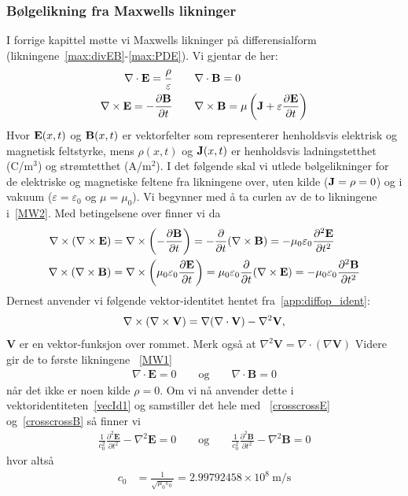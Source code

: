 \subsubsection{Bølgelikning fra Maxwells likninger}
I forrige kapittel møtte vi Maxwells likninger på differensialform (likningene~\eqref{max:divEB}-\eqref{max:PDE}). Vi gjentar de her: 
\begin{align}
\nabla \cdot \mathbf{E} = \frac{\rho}{\varepsilon}  &\qquad \nabla \cdot \mathbf{B} = 0 \label{MW1}\\
\nabla \times \mathbf{E} = -\frac{\partial \mathbf{B}}{\partial t} & \qquad \nabla \times \mathbf{B} = \mu \left( \mathbf{J} + \varepsilon \frac{\partial \mathbf{E}}{\partial t} \right)\label{MW2}
\end{align}
Hvor \( \mathbf{E}(x, t) \) og \( \mathbf{B}(x, t) \) er vektorfelter som representerer henholdsvis elektrisk og magnetisk feltstyrke, mens \( \rho(x, t) \) og \( \mathbf{J}(x, t) \) er henholdsvis ladningstetthet (C/m$^3$) og strømtetthet (A/m$^2$). 
I det følgende skal vi utlede bølgelikninger for de elektriske og magnetiske feltene fra likningene over, uten kilde ($\mathbf{J}=\rho=0$) og i vakuum ($\varepsilon=\varepsilon_0$ og $\mu=\mu_0$). Vi begynner med å ta curlen av de to likningene i~\eqref{MW2}. Med betingelsene over finner vi da 
\begin{align}
\label{crosscrossE}
\nabla \times (\nabla \times \mathbf{E}) 
&= \nabla \times \left( -\frac{\partial \mathbf{B}}{\partial t} \right) 
= -\frac{\partial}{\partial t} (\nabla \times \mathbf{B}) 
= -\mu_0 \varepsilon_0 \frac{\partial^2 \mathbf{E}}{\partial t^2} \\
\label{crosscrossB}\nabla \times (\nabla \times \mathbf{B}) 
&= \nabla \times \left( \mu_0 \varepsilon_0 \frac{\partial \mathbf{E}}{\partial t} \right) 
= \mu_0 \varepsilon_0 \frac{\partial}{\partial t} (\nabla \times \mathbf{E}) 
= -\mu_0 \varepsilon_0 \frac{\partial^2 \mathbf{B}}{\partial t^2}
\end{align}
Dernest anvender vi følgende vektor-identitet hentet fra~\ref{app:diffop_ident}:
\begin{align}
\label{vecId1}
\nabla \times (\nabla \times \mathbf{V}) = \nabla (\nabla \cdot \mathbf{V}) - \nabla^2 \mathbf{V},
\end{align}
$\mathbf{V}$ er en vektor-funksjon over rommet. Merk også at 
$\nabla^2 \mathbf{V} = \nabla \cdot (\nabla \mathbf{V})$
Videre gir de to første likningene ~\eqref{MW1}
\begin{align}
\nabla \cdot \mathbf{E} = 0\quad\quad\textrm{og}\quad\quad
\nabla \cdot \mathbf{B} = 0
\end{align}
når det ikke er noen kilde $\rho=0$.
Om vi nå anvender dette i vektoridentiteten~\eqref{vecId1} og samstiller det hele med ~\eqref{crosscrossE} og~\eqref{crosscrossB} så finner vi
\begin{align*}
\frac{1}{c_0^2} \frac{\partial^2 \mathbf{E}}{\partial t^2} - \nabla^2 \mathbf{E}= 0\quad\quad\textrm{og}\quad\quad
\frac{1}{c_0^2} \frac{\partial^2 \mathbf{B}}{\partial t^2} - \nabla^2 \mathbf{B}= 0
\end{align*}
hvor altså 
\begin{align*}
c_0 &= \frac{1}{\sqrt{\mu_0 \varepsilon_0}} = 2.99792458 \times 10^8 \ \text{m/s}
\end{align*}

